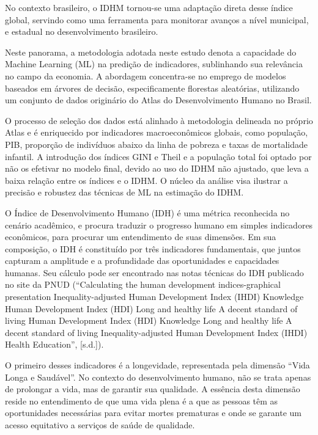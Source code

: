 \documentclass[
]{article}
\begin{document}
No contexto brasileiro, o IDHM tornou-se uma adaptação direta desse
índice global, servindo como uma ferramenta para monitorar avanços a
nível municipal, e estadual no desenvolvimento brasileiro.

Neste panorama, a metodologia adotada neste estudo denota a capacidade
do Machine Learning (ML) na predição de indicadores, sublinhando sua
relevância no campo da economia. A abordagem concentra-se no emprego de
modelos baseados em árvores de decisão, especificamente florestas
aleatórias, utilizando um conjunto de dados originário do Atlas do
Desenvolvimento Humano no Brasil.

O processo de seleção dos dados está alinhado à metodologia delineada no
próprio Atlas e é enriquecido por indicadores macroeconômicos globais,
como população, PIB, proporção de indivíduos abaixo da linha de pobreza
e taxas de mortalidade infantil. A introdução dos índices GINI e Theil e
a população total foi optado por não os efetivar no modelo final, devido
ao uso do IDHM não ajustado, que leva a baixa relação entre os índices e
o IDHM. O núcleo da análise visa ilustrar a precisão e robustez das
técnicas de ML na estimação do IDHM.

O Índice de Desenvolvimento Humano (IDH) é uma métrica reconhecida no
cenário acadêmico, e procura traduzir o progresso humano em simples
indicadores econômicos, para procurar um entendimento de suas dimensões.
Em sua composição, o IDH é constituído por três indicadores
fundamentais, que juntos capturam a amplitude e a profundidade das
oportunidades e capacidades humanas. Seu cálculo pode ser encontrado nas
notas técnicas do IDH publicado no site da PNUD (``Calculating the human
development indices-graphical presentation Inequality-adjusted Human
Development Index (IHDI) Knowledge Human Development Index (HDI) Long
and healthy life A decent standard of living Human Development Index
(HDI) Knowledge Long and healthy life A decent standard of living
Inequality-adjusted Human Development Index (IHDI) Health Education'',
{[}s.d.{]}).

O primeiro desses indicadores é a longevidade, representada pela
dimensão ``Vida Longa e Saudável''. No contexto do desenvolvimento
humano, não se trata apenas de prolongar a vida, mas de garantir sua
qualidade. A essência desta dimensão reside no entendimento de que uma
vida plena é a que as pessoas têm as oportunidades necessárias para
evitar mortes prematuras e onde se garante um acesso equitativo a
serviços de saúde de qualidade.
\end{document}
